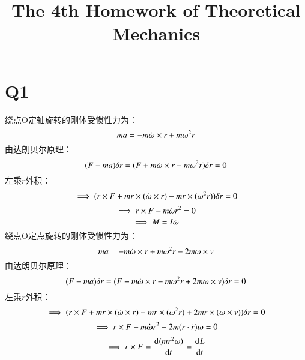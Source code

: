\documentclass[UTF8,9pt]{ctexart}
\title{The 4th Homework of Theoretical Mechanics}
\begin{document}
 
\maketitle
\section{Q1}
        绕点O定轴旋转的刚体受惯性力为：
        $$ma=-m\dot{\omega}\times r+m\omega^2r$$
        由达朗贝尔原理：
        $$(F-ma)\delta r=(F+m\dot{\omega}\times r-m\omega^2r)\delta r=0$$
        左乘$r$外积：
        $$\implies (r\times F+m r\times(\dot{\omega}\times r)-mr \times(\omega^2r))\delta r=0$$
        $$\implies r\times F-m\dot{\omega} r^2=0$$
        $$\implies M=I\dot{\omega}$$
        绕点O定点旋转的刚体受惯性力为：
        $$ma=-m\dot{\omega}\times r+m\omega^2r-2m\omega\times v$$
        由达朗贝尔原理：
        $$(F-ma)\delta r=(F+m\dot{\omega}\times r-m\omega^2r+2m\omega\times v)\delta r=0$$
        左乘$r$外积：
        $$\implies (r\times F+m r\times(\dot{\omega}\times r)-mr \times(\omega^2r)+2mr\times(\omega\times v))\delta r=0$$
        $$\implies r\times F-m\bm{\dot{\omega}} r^2-2m(r\cdot \dot r)\bm{\omega}=0$$
        $$\implies r\times F =\frac{\mathrm{d}^{} (mr^2\omega)}{\mathrm{d} t^{}} =\frac{\mathrm{d}^{} L}{\mathrm{d} t^{}}$$
\end{document}
